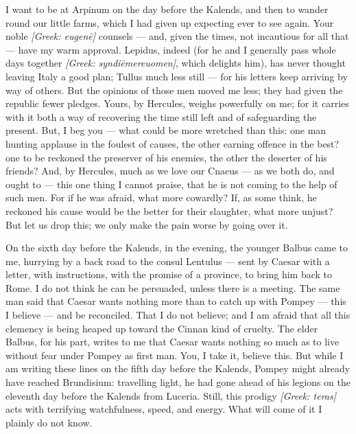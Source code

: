  I want to be at Arpinum on the day before the Kalends, and then to wander round our little farms, which I had given up expecting ever to see again. Your noble \textit{[Greek: eugenē]} counsels --- and, given the times, not incautious for all that --- have my warm approval. Lepidus, indeed (for he and I generally pass whole days together \textit{[Greek: syndiēmereuomen]}, which delights him), has never thought leaving Italy a good plan; Tullus much less still --- for his letters keep arriving by way of others. But the opinions of those men moved me less; they had given the republic fewer pledges. Yours, by Hercules, weighs powerfully on me; for it carries with it both a way of recovering the time still left and of safeguarding the present. But, I beg you --- what could be more wretched than this: one man hunting applause in the foulest of causes, the other earning offence in the best? one to be reckoned the preserver of his enemies, the other the deserter of his friends? And, by Hercules, much as we love our Cnaeus --- as we both do, and ought to --- this one thing I cannot praise, that he is not coming to the help of such men. For if he was afraid, what more cowardly? If, as some think, he reckoned his cause would be the better for their slaughter, what more unjust? But let us drop this; we only make the pain worse by going over it.

 On the sixth day before the Kalends, in the evening, the younger Balbus came to me, hurrying by a back road to the consul Lentulus --- sent by Caesar with a letter, with instructions, with the promise of a province, to bring him back to Rome. I do not think he can be persuaded, unless there is a meeting. The same man said that Caesar wants nothing more than to catch up with Pompey --- this I believe --- and be reconciled. That I do not believe; and I am afraid that all this clemency is being heaped up toward the Cinnan kind of cruelty. The elder Balbus, for his part, writes to me that Caesar wants nothing so much as to live without fear under Pompey as first man. You, I take it, believe this. But while I am writing these lines on the fifth day before the Kalends, Pompey might already have reached Brundisium: travelling light, he had gone ahead of his legions on the eleventh day before the Kalends from Luceria. Still, this prodigy \textit{[Greek: teras]} acts with terrifying watchfulness, speed, and energy. What will come of it I plainly do not know.
